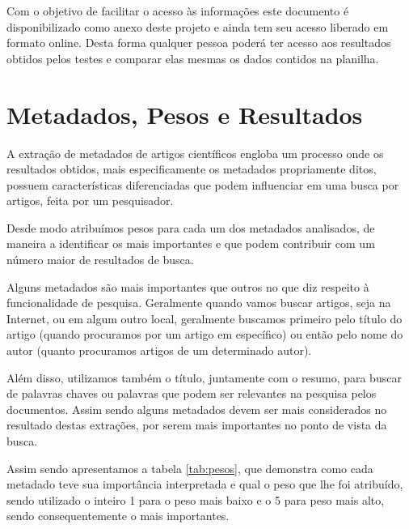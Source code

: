 \documentclass[
	12pt,               %
	openright,          %
	twoside,            %
	a4paper,            %
	english,            %
	brazil              %
	]{abntex2}
\begin{document}

Com o objetivo de facilitar o acesso às informações este documento é disponibilizado como anexo deste projeto e ainda tem seu acesso liberado em formato online. Desta forma qualquer pessoa poderá ter acesso aos resultados obtidos pelos testes e comparar elas mesmas os dados contidos na planilha.

\section{Metadados, Pesos e Resultados}


A extração de metadados de artigos científicos engloba um processo onde os resultados obtidos, mais especificamente os metadados propriamente ditos, possuem características diferenciadas que podem influenciar em uma busca por artigos, feita por um pesquisador.

Desde modo atribuímos pesos para cada um dos metadados analisados, de maneira a identificar os mais importantes e que podem contribuir com um número maior de resultados de busca. 


Alguns metadados são mais importantes que outros no que diz respeito à funcionalidade de pesquisa. Geralmente quando vamos buscar artigos, seja na Internet, ou em algum outro local, geralmente buscamos primeiro pelo título do artigo (quando procuramos por um artigo em específico) ou então pelo nome do autor (quanto procuramos artigos de um determinado autor).

Além disso, utilizamos também o título, juntamente com o resumo, para buscar de palavras chaves ou palavras que podem ser relevantes na pesquisa pelos documentos. Assim sendo alguns metadados devem ser mais considerados no resultado destas extrações, por serem mais importantes no ponto de vista da busca.

Assim sendo apresentamos a tabela \ref{tab:pesos}, que demonstra como cada metadado teve sua importância interpretada e qual o peso que lhe foi atribuído, sendo utilizado o inteiro 1 para o peso mais baixo e o 5 para peso mais alto, sendo consequentemente o mais importantes.

\end{document}
